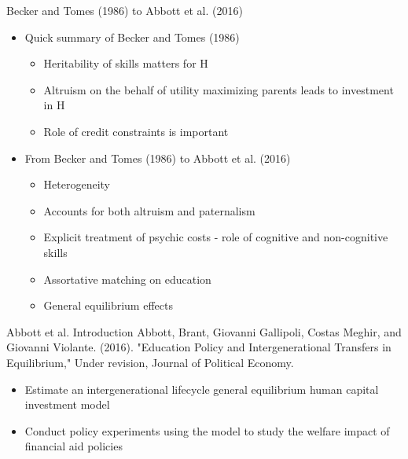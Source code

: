 \documentclass{beamer}
\begin{document}
\begin{frame}{Becker and Tomes (1986) to Abbott et al. (2016) }
\begin{itemize}
\item Quick summary of Becker and Tomes (1986)
\begin{itemize}
\item Heritability of skills matters for H
\item Altruism on the behalf of utility maximizing parents leads to investment in H
\item Role of credit constraints is important
\end{itemize}

\item From Becker and Tomes (1986) to Abbott et al.  (2016)
\begin{itemize}
\item Heterogeneity 
\item Accounts for both altruism and paternalism
\item Explicit treatment of psychic costs - role of cognitive and non-cognitive skills
\item Assortative matching on education 
\item General equilibrium effects
\end{itemize}
\end{itemize} 
\end{frame}


\begin{frame}{Abbott et al. Introduction}
Abbott, Brant, Giovanni Gallipoli, Costas Meghir, and Giovanni Violante. (2016). "Education Policy and Intergenerational Transfers in Equilibrium," Under revision, Journal of Political Economy. \\

\begin{itemize}
\item Estimate an intergenerational lifecycle general equilibrium human capital investment model 
\item Conduct policy experiments using the model to study the welfare impact of financial aid policies
\end{itemize}
\end{frame}
\end{document}
